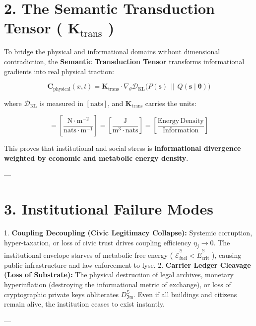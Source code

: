 \documentclass[11pt,a4paper]{article}
\theoremstyle{definition}
\theoremstyle{remark}
\begin{document}
\section{2. The Semantic Transduction Tensor ( $\mathbf{K}_{\text{trans}}$ )}

To bridge the physical and informational domains without dimensional contradiction, the \textbf{Semantic Transduction Tensor} transforms informational gradients into real physical traction:


\begin{equation}
\mathbf{C}_{\text{physical}}(x, t) = \mathbf{K}_{\text{trans}} \cdot \nabla_\theta \mathcal{D}_{\text{KL}}\Big( P(\mathbf{s}) \,\|\, Q(\mathbf{s} \mid \mathbf{\theta}) \Big)
\end{equation}


where $\mathcal{D}_{\text{KL}}$ is measured in $[\mathrm{nats}]$, and $\mathbf{K}_{\text{trans}}$ carries the units:


\begin{equation}
[\mathbf{K}_{\text{trans}}] = [ \frac{\mathrm{N \cdot m^{-2}}}{\mathrm{nats \cdot m^{-1}}} ] = [ \frac{\mathrm{J}}{\mathrm{m^3 \cdot nats}} ] = [ \frac{\mathrm{Energy \, Density}}{\mathrm{Information}} ]
\end{equation}


This proves that institutional and social stress is \textbf{informational divergence weighted by economic and metabolic energy density}.

---

\section{3. Institutional Failure Modes}

1. \textbf{Coupling Decoupling (Civic Legitimacy Collapse):}
Systemic corruption, hyper-taxation, or loss of civic trust drives coupling efficiency $\eta_j \to 0$. The institutional envelope starves of metabolic free energy ( $\dot{\mathcal{E}}_{\text{fuel}}^{\mathbb{S}} < \dot{E}_{\text{crit}}^{\mathbb{S}}$ ), causing public infrastructure and law enforcement to lyse.
2. \textbf{Carrier Ledger Cleavage (Loss of Substrate):}
The physical destruction of legal archives, monetary hyperinflation (destroying the informational metric of exchange), or loss of cryptographic private keys obliterates $D_{\mathfrak{Im}}^{\mathbb{S}}$. Even if all buildings and citizens remain alive, the institution ceases to exist instantly.

---
\end{document}
